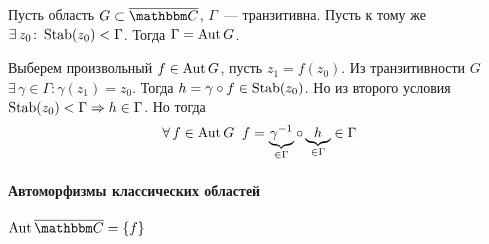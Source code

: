 \documentclass[12pt,timbord]{../../../notes}
\begin{document}
\begin{lem}\label{lem:tfcv::subautgr::subgrp}
  Пусть область $G\subset \exC$, $\Gamma$~--- транзитивна. Пусть к тому же $\exists\, z_0 \colon
  \operatorname{Stab}(z_0) < \Gamma$. Тогда $\Gamma=\operatorname{Aut} G$.
\end{lem}
\begin{itlproof}
  Выберем произвольный $f \in \operatorname{Aut} G$, пусть $z_1 = f(z_0)$. Из транзитивности $G$ 
  $\exists\, \gamma\in \Gamma\colon \gamma(z_1) = z_0$. Тогда $h = \gamma\circ f\in \operatorname{Stab} (z_0)$.
  Но из второго условия $\operatorname{Stab} (z_0) < \Gamma \Rightarrow h \in \Gamma$. Но тогда 
  \[
    \forall\, f\in \operatorname{Aut} G  \;\;f = \underbrace{\gamma^{-1}}_{\in \Gamma} \circ \underbrace{h}_{\in
    \Gamma} \in \Gamma
  \]
\end{itlproof}

\paragraph{Автоморфизмы классических областей}
\label{par:tfcv::classaut}

\begin{thrm}\label{thrm:tfcv::classaut::exC}
  $\displaystyle \Aut \exC  = \{f \}$
\end{thrm}
\end{document}
